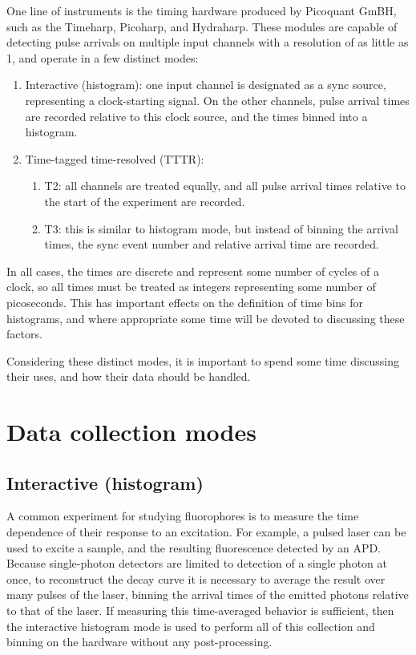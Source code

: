 \documentclass{book}
\numberwithin{equation}{section}
\numberwithin{figure}{section}
\begin{document}
One line of instruments is the timing hardware produced by Picoquant GmBH, such as the Timeharp, Picoharp, and Hydraharp. These modules are capable of detecting pulse arrivals on multiple input channels with a resolution of as little as 1\pico\second, and operate in a few distinct modes:
\begin{enumerate}
\item Interactive (histogram): one input channel is designated as a sync source, representing a clock-starting signal. On the other channels, pulse arrival times are recorded relative to this clock source, and the times binned into a histogram. 
\item Time-tagged time-resolved (TTTR): 
	\begin{enumerate}
	\item T2: all channels are treated equally, and all pulse arrival times relative to the start of the experiment are recorded. 
	\item T3: this is similar to histogram mode, but instead of binning the arrival times, the sync event number and relative arrival time are recorded.
	\end{enumerate}
\end{enumerate}

In all cases, the times are discrete and represent some number of cycles of a clock, so all times must be treated as integers representing some number of picoseconds. This has important effects on the definition of time bins for histograms, and where appropriate some time will be devoted to discussing these factors. 

Considering these distinct modes, it is important to spend some time discussing their uses, and how their data should be handled.

\section{Data collection modes}
\label{sec:modes}
\subsection{Interactive (histogram)}
A common experiment for studying fluorophores is to measure the time dependence of their response to an excitation. For example, a pulsed laser can be used to excite a sample, and the resulting fluorescence detected by an APD. Because single-photon detectors are limited to detection of a single photon at once, to reconstruct the decay curve it is necessary to average the result over many pulses of the laser, binning the arrival times of the emitted photons relative to that of the laser. If measuring this time-averaged behavior is sufficient, then the interactive histogram mode is used to perform all of this collection and binning on the hardware without any post-processing. 
\end{document}
